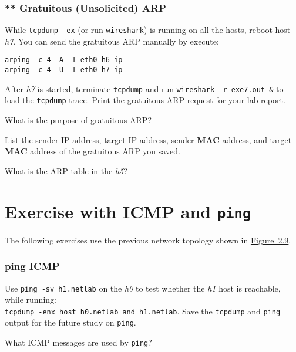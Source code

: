 \documentclass{../UTNetLab}
\begin{document}
\section{** Gratuitous (Unsolicited) ARP}
    While \lstinline{tcpdump -ex} (or run \lstinline{wireshark}) is running on all the hosts, reboot host \textit{h7}.
    You can send the gratuitous ARP manually by execute:

    \begin{lstlisting}[emph={eth0,h7-ip,h6-ip}]
arping -c 4 -A -I eth0 h6-ip
arping -c 4 -U -I eth0 h7-ip
    \end{lstlisting}

    After \textit{h7} is started, terminate \lstinline{tcpdump} and run \lstinline{wireshark -r exe7.out &} to load the \lstinline{tcpdump} trace.
    Print the gratuitous ARP request for your lab report.
    
    \begin{report}
        \item What is the purpose of gratuitous ARP?
    
        \item List the sender IP address, target IP address, sender \textbf{MAC} address, and target \textbf{MAC} address of the gratuitous ARP you saved.

        \item What is the ARP table in the \textit{h5}?
    \end{report}


\part{Exercise with ICMP and \texttt{ping}}\label{sec:icmp-ping}
    The following exercises use the previous network topology shown in \hyperref[fig:2.9]{Figure~2.9}.

\section{ping ICMP}
    Use \lstinline[emph={h1,netlab}]{ping -sv h1.netlab} on the \textit{h0} to test whether the \textit{h1} host is reachable, while running:\\
    \lstinline[emph={h0,h1,netlab},morekeywords={[3]host,and}]{tcpdump -enx host h0.netlab and h1.netlab}.
    Save the \lstinline{tcpdump} and \lstinline{ping} output for the future study on \lstinline{ping}.
    
    \begin{report}
        \item What ICMP messages are used by \lstinline{ping}?
    \end{report}
\end{document}
